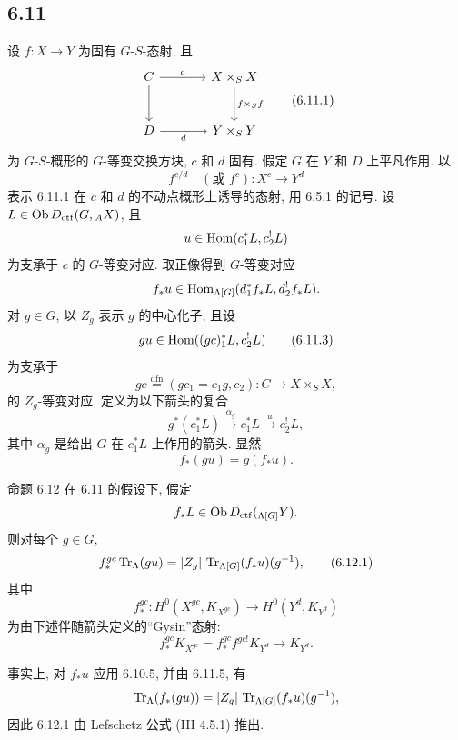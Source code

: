 \subsection*{6.11}
设 $f:X\to Y$ 为固有 $G$-$S$-态射, 且
\begin{equation}
\begin{tikzcd}[column sep=large,row sep=large]
C \arrow[r,"c"] \arrow[d] & X\times_SX \arrow[d,"f\times_Sf"]\\
D \arrow[r,"d"'] & Y\times_SY
\end{tikzcd}
\tag{6.11.1}
\end{equation}
为 $G$-$S$-概形的 $G$-等变交换方块, $c$ 和 $d$ 固有. 假定 $G$ 在 $Y$ 和 $D$ 上平凡作用. 以
\begin{equation}
f^{c/d}\quad(\text{或 } f^c):X^c\longrightarrow Y^d
\tag{6.11.2}
\end{equation}
表示 6.11.1 在 $c$ 和 $d$ 的不动点概形上诱导的态射, 用 6.5.1 的记号. 设 $L\in\operatorname{Ob} D_{\mathrm{ctf}}(G,{}_AX)$, 且
\[
u\in\operatorname{Hom}(c_1^*L,c_2^!L)
\]
为支承于 $c$ 的 $G$-等变对应. 取正像得到 $G$-等变对应
\[
f_*u\in\operatorname{Hom}_{\Lambda[G]}(d_1^*f_*L,d_2^!f_*L).
\]
对 $g\in G$, 以 $Z_g$ 表示 $g$ 的中心化子, 且设
\begin{equation}
gu\in\operatorname{Hom}((gc)_1^*L,c_2^!L)
\tag{6.11.3}
\end{equation}
为支承于
\begin{equation}
gc\stackrel{\mathrm{dfn}}{=}(gc_1=c_1g,c_2):C\to X\times_SX,
\tag{6.11.4}
\end{equation}
的 $Z_g$-等变对应, 定义为以下箭头的复合
\[
g^*(c_1^*L)\xrightarrow{\alpha_g}c_1^*L\xrightarrow{u}c_2^!L,
\]
其中 $\alpha_g$ 是给出 $G$ 在 $c_1^*L$ 上作用的箭头. 显然
\begin{equation}
f_*(gu)=g(f_*u).
\tag{6.11.5}
\end{equation}

\begin{statement}{命题 6.12}
在 6.11 的假设下, 假定
\[
f_*L\in\operatorname{Ob} D_{\mathrm{ctf}}({}_{\Lambda[G]}Y).
\]
则对每个 $g\in G$,
\begin{equation}
f_*^{gc}\operatorname{Tr}_{\Lambda}(gu)
=
|Z_g|\,\operatorname{Tr}_{\Lambda[G]}(f_*u)(g^{-1}),
\tag{6.12.1}
\end{equation}
其中
\[
f_*^{gc}:H^0(X^{gc},K_{X^{gc}})\longrightarrow H^0(Y^d,K_{Y^d})
\]
为由下述伴随箭头定义的``Gysin''态射:
\[
f_*^{gc}K_{X^{gc}}=f_*^{gc}f^{gc!}K_{Y^d}\longrightarrow K_{Y^d}.
\]
\end{statement}

事实上, 对 $f_*u$ 应用 6.10.5, 并由 6.11.5, 有
\[
\operatorname{Tr}_{\Lambda}(f_*(gu))=|Z_g|\,\operatorname{Tr}_{\Lambda[G]}(f_*u)(g^{-1}),
\]
因此 6.12.1 由 Lefschetz 公式 (III 4.5.1) 推出.


